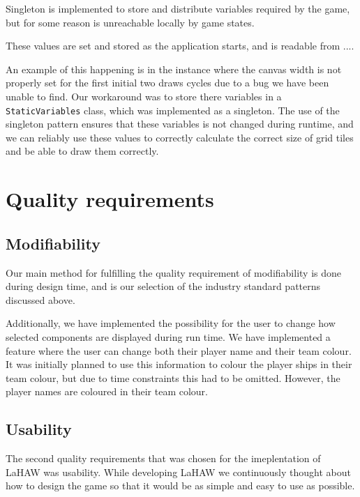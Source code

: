 Singleton is implemented to store and distribute variables required by the game, but for some reason is unreachable locally by game states. 

These values are set and stored as the application starts, and is readable from ....

An example of this happening is in the instance where the canvas width is not properly set for the first initial two draws cycles due to a bug we have been unable to find.
Our workaround was to store there variables in a \texttt{StaticVariables} class, which was implemented as a singleton. The use of the singleton pattern ensures that these variables is not changed during runtime, and we can reliably use these values to correctly calculate the correct size of grid tiles and be able to draw them correctly.


\section{Quality requirements}

\subsection{Modifiability}
Our main method for fulfilling the quality requirement of modifiability is done during design time, and is our selection of the industry standard patterns discussed above.


Additionally, we have implemented the possibility for the user to change how selected components are displayed during run time.
We have implemented a feature where the user can change both their player name and their team colour. It was initially planned to use this information to colour the player ships in their team colour, but due to time constraints this had to be omitted. However, the player names are coloured in their team colour.



\subsection{Usability}
The second quality requirements that was chosen for the imeplentation of LaHAW was usability. While developing LaHAW we continuously thought about how to design the game so that it would be as simple and easy to use as possible.

